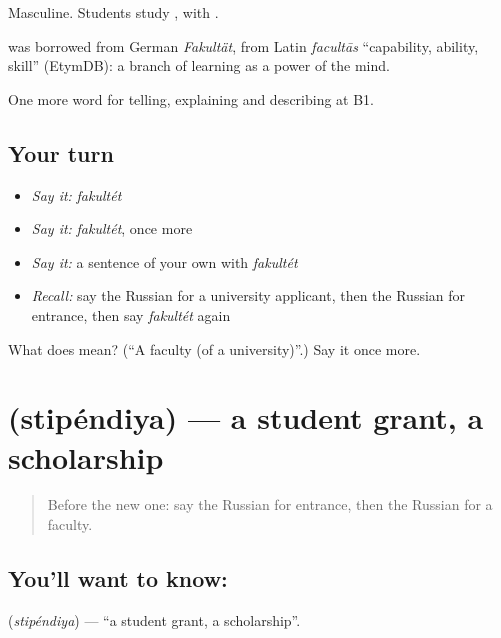 Masculine. Students study \emph{ }, with \emph{}.

\begin{cousinweb}
\textbf{} was borrowed from German \emph{Fakultät}, from Latin \emph{facultās} \textquotedblleft{}capability, ability, skill\textquotedblright{} (EtymDB): a branch of learning as a power of the mind.
\end{cousinweb}

\begin{grammarlens}[title={What you've built}]
One more word for telling, explaining and describing at B1.
\end{grammarlens}

\subsection*{Your turn}
\begin{itemize}
\raggedright
  \item \emph{Say it:} \emph{fakultét}
  \item \emph{Say it:} \emph{fakultét}, once more
  \item \emph{Say it:} a sentence of your own with \emph{fakultét}
  \item \emph{Recall:} say the Russian for a university applicant, then the Russian for entrance, then say \emph{fakultét} again
\end{itemize}

\begin{tcolorbox}[breakable,colback=teal!4,colframe=teal!35!black,title={Before you move on}]
What does  mean? (\textquotedblleft{}A faculty (of a university)\textquotedblright{}.) Say it once more.
\end{tcolorbox}
\section[\texorpdfstring{\ru{стипендия} (stipéndiya)}{стипендия (stipéndiya)}]{ (stipéndiya) — a student grant, a scholarship}

\label{lesson:RU-C383-stipendiya}



\begin{quote}
Before the new one: say the Russian for entrance, then the Russian for a faculty.
\end{quote}

\subsection*{You'll want to know: }
\textbf{} (\emph{stipéndiya}) — \textquotedblleft{}a student grant, a scholarship\textquotedblright{}.

